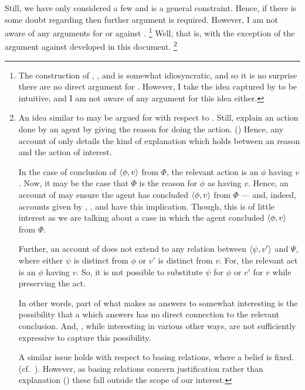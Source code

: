 \begin{note}
  Still, we have only considered a few  and \issueInclusion{} is a general constraint.
  Hence, if there is some doubt regarding \issueInclusion{} then further argument is required.
  However, I am not aware of any arguments for or against \issueInclusion{}.%
  \footnote{
    The construction of \qWhy{}, \qHow{}, and \issueInclusion{} is somewhat idiosyncratic, and so it is no surprise there are no direct argument for \issueInclusion{}.
    However, I take the idea captured by \issueInclusion{} to be intuitive, and I am not aware of any argument for this idea either.
  }
  Well, that is, with the exception of the argument against \issueInclusion{} developed in this document.%
  \footnote{
    An idea similar to \issueInclusion{} may be argued for with respect to \emph{}.
  Still,  explain an action done by an agent by giving the \agents{} reason for doing the action.
  (\cite[685]{Davidson:1963aa})
  Hence, any account of  only details the kind of explanation which holds between an \agents{} reason and the action of interest.

  In the case of conclusion of \(\langle\phi, v\rangle\) from \(\Phi\), the relevant action is an \evalion{} \(\phi\) having \val{} \(v\).
  Now, it may be the case that \(\Phi\) is the \agents{} reason for \evaling{} \(\phi\) as having \val{} \(v\).
  Hence, an account of  may ensure the agent has concluded \(\langle\phi, v\rangle\) from \(\Phi\) --- and, indeed, accounts given by \textcite{Davidson:1963aa}, \textcite{Hieronymi:2011aa}, and \textcite{Harman:1973ww} have this implication.
  Though, this is of little interest as we are talking about a case in which the agent concluded \(\langle\phi, v\rangle\) from \(\Phi\).

  Further, an account of  does not extend to any relation between \(\langle\psi, v'\rangle\) and \(\Psi\), where either \(\psi\) is distinct from \(\phi\) or \(v'\) is distinct from \(v\).
  For, the relevant act is an \evalion{} \(\phi\) having \val{} \(v\).
  So, it is not possible to substitute \(\psi\) for \(\phi\) or \(v'\) for \(v\) while preserving the act.

  In other words, part of what makes  as answers to \qWhy{} somewhat interesting is the possibility that a  which answers \qWhy{} has no direct connection to the relevant conclusion.
  And, , while interesting in various other ways, are not sufficiently expressive to capture this possibility.

  A similar issue holds with respect to basing relations, where a belief is fixed.
  (cf.\ \cite{Korcz:2021ue}).
  However, as basing relations concern justification rather than explanation (\cite[cf.][35]{Pollock:1999tm}) these fall outside the scope of our interest.
  }
\end{note}



